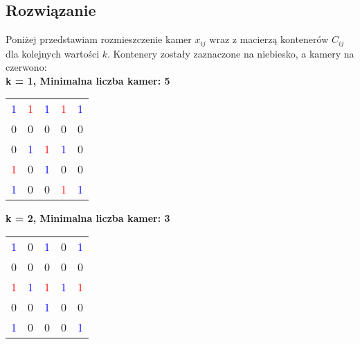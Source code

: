 \documentclass{article}
\begin{document}
\subsection{Rozwiązanie}
Poniżej przedstawiam rozmieszczenie kamer $x_{ij}$ wraz z macierzą kontenerów $C_{ij}$ dla kolejnych wartości $k$. Kontenery zostały zaznaczone na niebiesko, a kamery na czerwono:\\

\centering \textbf{k = 1, Minimalna liczba kamer: 5}
\begin{table}[H]
    \centering
    \begin{tabular}{|c|c|c|c|c|}
        \hline
        \textcolor{blue}{1} & \textcolor{red}{1} & \textcolor{blue}{1} & \textcolor{red}{1} & \textcolor{blue}{1} \\
        0 & 0 & 0 & 0 & 0 \\
        0 & \textcolor{blue}{1} & \textcolor{red}{1} & \textcolor{blue}{1} & 0 \\
        \textcolor{red}{1} & 0 & \textcolor{blue}{1} & 0 & 0 \\
        \textcolor{blue}{1} & 0 & 0 & \textcolor{red}{1} & \textcolor{blue}{1} \\
        \hline
    \end{tabular}
\end{table}

\centering \textbf{k = 2, Minimalna liczba kamer: 3}
\begin{table}[H]
    \centering
    \begin{tabular}{|c|c|c|c|c|}
        \hline
        \textcolor{blue}{1} & 0 & \textcolor{blue}{1} & 0 & \textcolor{blue}{1} \\
        0 & 0 & 0 & 0 & 0 \\
        \textcolor{red}{1} & \textcolor{blue}{1} & \textcolor{red}{1} & \textcolor{blue}{1} & \textcolor{red}{1} \\
        0 & 0 & \textcolor{blue}{1} & 0 & 0 \\
        \textcolor{blue}{1} & 0 & 0 & 0 & \textcolor{blue}{1} \\
        \hline
    \end{tabular}
\end{table}
\end{document}
